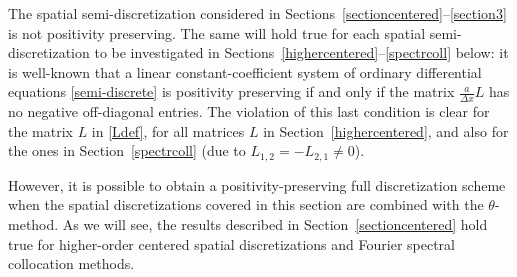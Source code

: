 \documentclass[a4paper]{article}
\newcommand{\dx}{\Delta x}
\begin{document}
The spatial semi-discretization considered in Sections~\ref{sectioncentered}--\ref{section3} is not positivity preserving. The same will hold true for each spatial semi-discretization to be investigated in Sections~\ref{highercentered}--\ref{spectrcoll} below: it is well-known \cite[Chapter I,
Theorem 7.2]{hundsdorferverwer} that a linear constant-coefficient system of ordinary differential equations 
\eqref{semi-discrete} is positivity preserving if and only if the
matrix $\frac{a}{\dx}L$ has no negative off-diagonal entries. The violation of this last condition is clear for the matrix 
$L$ in \eqref{Ldef}, for all matrices $L$ in Section~\ref{highercentered}, and also for the ones in Section~\ref{spectrcoll} (due to $L_{1,2}=-L_{2,1}\ne 0$).

However, it is possible to obtain a positivity-preserving full discretization scheme when the spatial
discretizations covered in this section are combined with the $\theta$-method.
As we will see, the results described in Section~\ref{sectioncentered} hold true for higher-order centered
spatial discretizations and Fourier spectral collocation methods.
\end{document}
